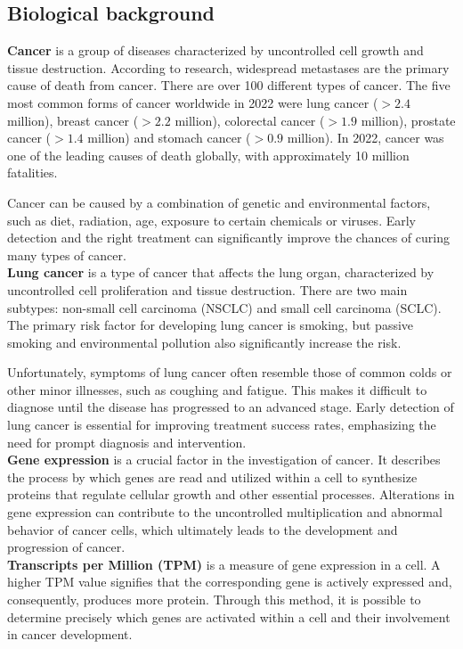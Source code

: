 \subsection{Biological background} \label{subsec:biological_background}
\textbf{Cancer} is a group of diseases characterized by uncontrolled cell growth and tissue destruction.
According to research, widespread metastases are the primary cause of death from cancer\cite{who_cancer_fact_sheet}.
There are over 100 different types of cancer\cite{nci_cancer_types}.
The five most common forms of cancer worldwide in 2022 were lung cancer ($>2.4$ million),
breast cancer ($>2.2$ million), colorectal cancer ($>1.9$ million), prostate cancer ($>1.4$ million) and
stomach cancer ($>0.9$ million).
In 2022, cancer was one of the leading causes of death globally,
with approximately 10 million fatalities\cite{ferlay2024global}.

Cancer can be caused by a combination of genetic and environmental factors,
such as diet, radiation, age, exposure to certain chemicals or viruses\cite{nci_cancer_risk}.
Early detection and the right treatment can significantly improve the chances of curing many types of cancer.
\\

\textbf{Lung cancer} is a type of cancer that affects the lung organ,
characterized by uncontrolled cell proliferation and tissue destruction.
There are two main subtypes: non-small cell carcinoma (NSCLC) and small cell carcinoma (SCLC)\cite{nci_lung_cancer_types}.
The primary risk factor for developing lung cancer is smoking,
but passive smoking and environmental pollution also significantly increase the risk.

Unfortunately, symptoms of lung cancer often resemble those of common colds or other minor illnesses,
such as coughing and fatigue.
This makes it difficult to diagnose until the disease has progressed to an advanced stage\cite{who_lung_cancer}.
Early detection of lung cancer is essential for improving treatment success rates,
emphasizing the need for prompt diagnosis and intervention.
\\

\textbf{Gene expression} is a crucial factor in the investigation of cancer.
It describes the process by which genes are read and utilized within a cell to synthesize proteins
that regulate cellular growth and other essential processes.
Alterations in gene expression can contribute to the uncontrolled multiplication and abnormal behavior of cancer cells,
which ultimately leads to the development and progression of cancer.
\\

\textbf{Transcripts per Million (TPM)} is a measure of gene expression in a cell.
A higher TPM value signifies that the corresponding gene is actively expressed and, consequently, produces more protein.
Through this method, it is possible to determine precisely which genes are activated within a cell and
their involvement in cancer development.